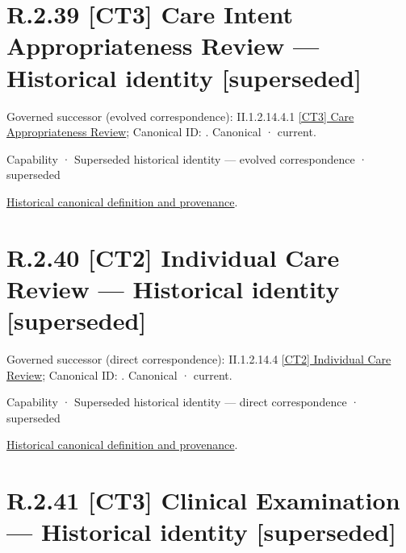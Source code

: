 \section*{R.2.39 [CT3] Care Intent Appropriateness Review — Historical identity [superseded]}
\label{navigation:R.2.39}

{\small Governed successor (evolved correspondence): II.1.2.14.4.1 \hyperref[element:5eac5fb73e31416288d8c992805b33cb]{[CT3] Care Appropriateness Review}; Canonical ID: \texttt{}. Canonical · current.}\par
\label{element:905eb2de1ac341ac96331e3d7f76079b}
{\small Capability · Superseded historical identity — evolved correspondence · superseded}\par
\href{../../../../../../../continuum/strategy/capability/905eb2de1ac341ac96331e3d7f76079b.md}{Historical canonical definition and provenance}.\par
\section*{R.2.40 [CT2] Individual Care Review — Historical identity [superseded]}
\label{navigation:R.2.40}

{\small Governed successor (direct correspondence): II.1.2.14.4 \hyperref[element:625a93f132f242f5a8e2ae1dc19979fb]{[CT2] Individual Care Review}; Canonical ID: \texttt{}. Canonical · current.}\par
\label{element:e1048f6c635d4e16b5384cc2cb45a71b}
{\small Capability · Superseded historical identity — direct correspondence · superseded}\par
\href{../../../../../../../continuum/strategy/capability/e1048f6c635d4e16b5384cc2cb45a71b.md}{Historical canonical definition and provenance}.\par
\section*{R.2.41 [CT3] Clinical Examination — Historical identity [superseded]}
\label{navigation:R.2.41}


